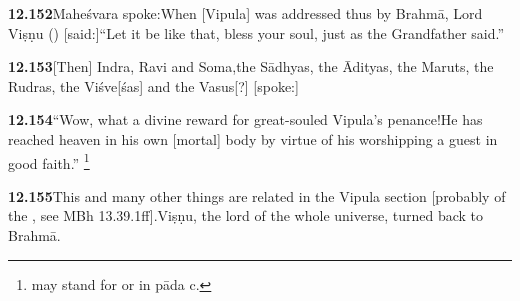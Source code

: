 \textbf{12.152}Maheśvara spoke:When [Vipula] was addressed thus by Brahmā,                Lord Viṣṇu () [said:]``Let it be like that, bless your soul, just as the Grandfather said.''%


\textbf{12.153}[Then] Indra, Ravi and Soma,the Sādhyas, the Ādityas, the Maruts, the Rudras, the Viśve[śas] and the Vasus[?] [spoke:]%


\textbf{12.154}``Wow, what a divine reward for great-souled Vipula's penance!He has reached heaven in his own [mortal] body by virtue of                                his worshipping a guest in good faith.''%
\footnote{ may stand for  or  in pāda c.  }%


\textbf{12.155}This and many other things are related in the Vipula section [probably                                of the , see MBh 13.39.1ff].Viṣṇu, the lord of the whole universe, turned back to Brahmā.%
